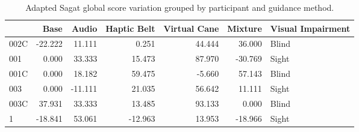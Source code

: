 
\begin{table}[!htb]
\centering
\caption{Adapted Sagat global score variation grouped by participant and guidance method.}
\label{tab:sagat_var}
\begin{tabular}{lrrrrrl}
\toprule
{} &    Base &   Audio &  Haptic Belt &  Virtual Cane &  Mixture & Visual Impairment \\
\midrule
002C & -22.222 &  11.111 &        0.251 &        44.444 &   36.000 &             Blind \\
001  &   0.000 &  33.333 &       15.473 &        87.970 &  -30.769 &             Sight \\
001C &   0.000 &  18.182 &       59.475 &        -5.660 &   57.143 &             Blind \\
003  &   0.000 & -11.111 &       21.035 &        56.642 &   11.111 &             Sight \\
003C &  37.931 &  33.333 &       13.485 &        93.133 &    0.000 &             Blind \\
1    & -18.841 &  53.061 &      -12.963 &        13.953 &  -18.966 &             Sight \\
\bottomrule
\end{tabular}
\end{table}

